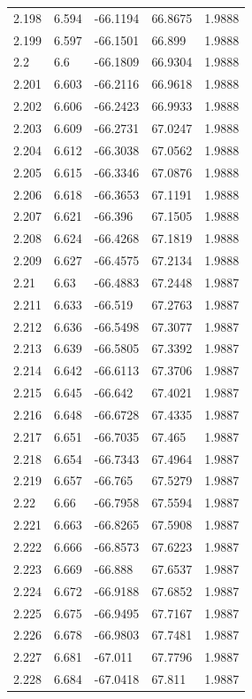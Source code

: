 \begin{tabular}{lllll}
2.198 & 6.594 & -66.1194 & 66.8675 & 1.9888 \\
2.199 & 6.597 & -66.1501 & 66.899 & 1.9888 \\
2.2 & 6.6 & -66.1809 & 66.9304 & 1.9888 \\
2.201 & 6.603 & -66.2116 & 66.9618 & 1.9888 \\
2.202 & 6.606 & -66.2423 & 66.9933 & 1.9888 \\
2.203 & 6.609 & -66.2731 & 67.0247 & 1.9888 \\
2.204 & 6.612 & -66.3038 & 67.0562 & 1.9888 \\
2.205 & 6.615 & -66.3346 & 67.0876 & 1.9888 \\
2.206 & 6.618 & -66.3653 & 67.1191 & 1.9888 \\
2.207 & 6.621 & -66.396 & 67.1505 & 1.9888 \\
2.208 & 6.624 & -66.4268 & 67.1819 & 1.9888 \\
2.209 & 6.627 & -66.4575 & 67.2134 & 1.9888 \\
2.21 & 6.63 & -66.4883 & 67.2448 & 1.9887 \\
2.211 & 6.633 & -66.519 & 67.2763 & 1.9887 \\
2.212 & 6.636 & -66.5498 & 67.3077 & 1.9887 \\
2.213 & 6.639 & -66.5805 & 67.3392 & 1.9887 \\
2.214 & 6.642 & -66.6113 & 67.3706 & 1.9887 \\
2.215 & 6.645 & -66.642 & 67.4021 & 1.9887 \\
2.216 & 6.648 & -66.6728 & 67.4335 & 1.9887 \\
2.217 & 6.651 & -66.7035 & 67.465 & 1.9887 \\
2.218 & 6.654 & -66.7343 & 67.4964 & 1.9887 \\
2.219 & 6.657 & -66.765 & 67.5279 & 1.9887 \\
2.22 & 6.66 & -66.7958 & 67.5594 & 1.9887 \\
2.221 & 6.663 & -66.8265 & 67.5908 & 1.9887 \\
2.222 & 6.666 & -66.8573 & 67.6223 & 1.9887 \\
2.223 & 6.669 & -66.888 & 67.6537 & 1.9887 \\
2.224 & 6.672 & -66.9188 & 67.6852 & 1.9887 \\
2.225 & 6.675 & -66.9495 & 67.7167 & 1.9887 \\
2.226 & 6.678 & -66.9803 & 67.7481 & 1.9887 \\
2.227 & 6.681 & -67.011 & 67.7796 & 1.9887 \\
2.228 & 6.684 & -67.0418 & 67.811 & 1.9887 \\

\end{tabular}
